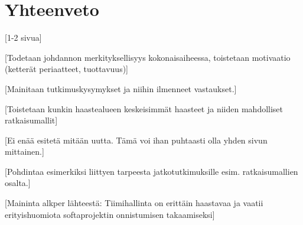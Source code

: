 \chapter{Yhteenveto\label{conclusions}}

[1-2 sivua]

[Todetaan johdannon merkityksellisyys kokonaisaiheessa, toistetaan motivaatio (ketterät periaatteet, tuottavuus)]

[Mainitaan tutkimuskysymykset ja niihin ilmenneet vastaukset.]

[Toistetaan kunkin haastealueen keskeisimmät haasteet ja niiden mahdolliset ratkaisumallit]

[Ei enää esitetä mitään uutta. Tämä voi ihan puhtaasti olla yhden sivun mittainen.]

[Pohdintaa esimerkiksi liittyen tarpeesta jatkotutkimuksille esim. ratkaisumallien osalta.]

[Maininta alkper lähteestä: Tiimihallinta on erittäin haastavaa ja vaatii erityishuomiota softaprojektin onnistumisen takaamiseksi]
